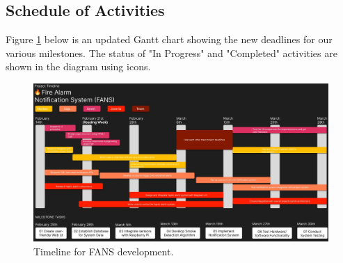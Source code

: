 \subsection{Schedule of Activities}

Figure \ref{fig:timeline} below is an updated Gantt chart showing the new deadlines for our various milestones. The
status of "In Progress" and "Completed" activities are shown in the diagram using icons.

\begin{figure}[H]
    \centering
    \includegraphics[width=\linewidth]{../assets/SYSC3010_ProjectTimeline.jpg}
    \caption{Timeline for FANS development.}
    \label{fig:timeline}
\end{figure}
